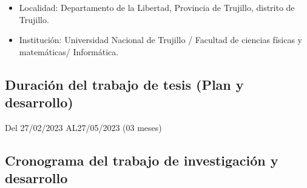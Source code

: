 \documentclass[a4paper, 12pt]{article}
\begin{document}
\begin{itemize}

\item Localidad: 
Departamento de la Libertad, Provincia de Trujillo, distrito de Trujillo.

\item Institución: 
Universidad Nacional de Trujillo / Facultad de ciencias físicas y matemáticas/ Informática.

\end{itemize}

\subsection{Duración del trabajo de tesis (Plan y desarrollo)}
\hspace*{0.7cm}Del \hspace*{0.2cm}27/02/2023 \hspace*{0.3cm} AL\hspace*{0.2cm}27/05/2023  \hspace*{0.2cm}(03 meses)
 
\subsection{Cronograma del trabajo de investigación y desarrollo}
\end{document}
